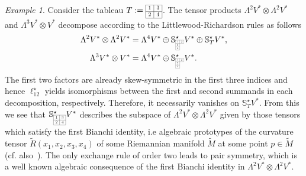 \documentclass[11pt,a4paper]{article}
\theoremstyle{plain}
\theoremstyle{remark}
\newtheorem{example}{Example}
\newcommand{\bbS}{\mathbb{S}}
\begin{document}
\bigskip
\begin{example}
Consider the tableau $T := \scaleto{\begin{array}{|c|c|}
\cline{1-2}
1 & 3 \\
\cline{1-2}
2 & 4 \\
\cline{1-2}
\end{array}}{16pt}$. The tensor products $\Lambda^2V^*\otimes \Lambda^2V^*$ and  $\Lambda^3V^*\otimes V^*$ decompose according to the Littlewood-Richardson rules as follows
\begin{align*}
\Lambda^2V^*\otimes \Lambda^2V^* & = \Lambda^4V^*\oplus \bbS^\star_{\scaleto{\begin{array}{|c|c|}
\cline{1-2}
1 & 3\\
\cline{1-2}
2 &  \multicolumn{1}{c}{} \\
\cline{1-1}
4 &  \multicolumn{1}{c}{}\\
\cline{1-1}
\end{array}}{12pt}} V^*\oplus  \bbS^\star_TV^*,\\
\Lambda^3V^*\otimes V^* &= \Lambda^4V^*\oplus \bbS^\star_{\scaleto{\begin{array}{|c|c|}
\cline{1-2}
1 & 3\\
\cline{1-2}
2 &  \multicolumn{1}{c}{} \\
\cline{1-1}
4 &  \multicolumn{1}{c}{}\\
\cline{1-1}
\end{array}}{12pt}} V^*.
\end{align*}
The first two factors are already skew-symmetric in the first three indices and hence $\ell_{12}^\star$ yields isomorphisms between the first and second summands in each decomposition, respectively. Therefore, it 
necessarily vanishes on $\bbS^\star_TV^*$. From this we see that $\bbS^\star_{\scaleto{\begin{array}{|c|c|}
\cline{1-2}
1 & 3 \\
\cline{1-2}
2 & 4 \\
\cline{1-2}
\end{array}}{12pt}}V^*$ describes the subspace of $\Lambda^2V^*\otimes \Lambda^2V^*$ given by those tensors which satisfy the first Bianchi identity, i.e algebraic prototypes of the
curvature tensor $\tilde R(x_1,x_2,x_3,x_4)$ of some Riemannian manifold
$\tilde M$ at some point $p\in \tilde M$ (cf. also~\cite[p.12]{Sch}).  The
only exchange rule of order two leads to pair symmetry, which is a well
known algebraic consequence of the first Bianchi identity in $\Lambda^2V^*\otimes \Lambda^2V^*$.
\end{example}
\end{document}
